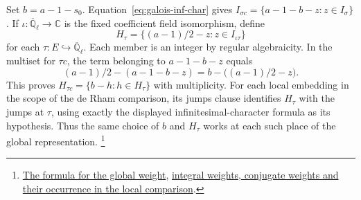 Set \(b=a-1-s_0\). Equation~\eqref{eq:galois-inf-char} gives
\(I_{\sigma c}=\{a-1-b-z:z\in I_\sigma\}\). If
\(\iota:\overline{\mathbb Q}_\ell\to\mathbb C\) is the fixed
coefficient field isomorphism, define
\[
       H_\tau=\{(a-1)/2-z:z\in I_{\iota\tau}\}
\]
for each \(\tau:E\hookrightarrow\overline{\mathbb Q}_\ell\).
Each member is an integer by regular algebraicity. In the multiset
for \(\tau c\), the term belonging to \(a-1-b-z\) equals
\[
       (a-1)/2-(a-1-b-z)=b-\bigl((a-1)/2-z\bigr).
\]
This proves \(H_{\tau c}=\{b-h:h\in H_\tau\}\) with multiplicity.
For each local embedding in the scope of the de Rham comparison,
its jumps clause identifies \(H_\tau\) with the jumps at \(\tau\),
using exactly the displayed infinitesimal-character formula as its
hypothesis. Thus the same choice of \(b\) and \(H_\tau\) works at
each such place of the global representation.
\footnote{\href{https://github.com/Deicyde/riemann-hypothesis/blob/40e56bab/src/Development/AbelianVarietyTheory/Proofs/SatakeParameters/ExistsIsWeight.lean\#L138-L150}{The formula for the global weight},
\href{https://github.com/Deicyde/riemann-hypothesis/blob/40e56bab/src/Development/AutomorphicArithmetic/Foundations/GaloisRepresentations/IntegralStructures/InertCharpoly/GaloisLocalGlobalOfLocalGlobalCompatibility.lean\#L127-L171}{integral weights, conjugate weights and their occurrence in the local comparison}.}
